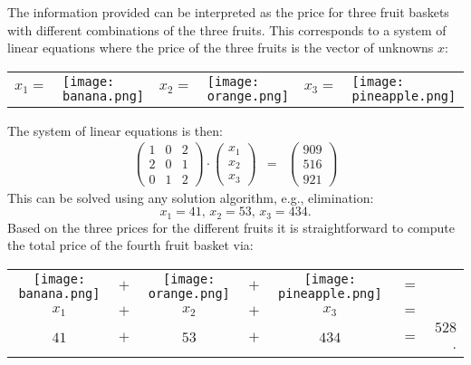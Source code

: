 \begin{solution}
The information provided can be interpreted as the price for three fruit baskets
with different combinations of the three fruits. This corresponds to a system of
linear equations where the price of the three fruits is the vector of unknowns $x$:
\begin{center}
\begin{tabular}{clclcl}
$x_1 =$ & \texttt{[image: banana.png]} & $x_2 =$ & \texttt{[image: orange.png]} & $x_3 =$ & \texttt{[image: pineapple.png]}
\end{tabular}
\end{center}
The system of linear equations is then:
\begin{eqnarray*}
\left( \begin{array}{rrr} 1 & 0 & 2 \\ 2 & 0 & 1 \\ 0 & 1 & 2 \end{array} \right) \cdot \left( \begin{array}{r} x_1 \\ x_2 \\ x_3 \end{array} \right) & = & \left( \begin{array}{r} 909 \\ 516 \\ 921 \end{array} \right)
\end{eqnarray*}
This can be solved using any solution algorithm, e.g., elimination:
$$
x_1 = 41, \, x_2 = 53, \, x_3 = 434.
$$
Based on the three prices for the different fruits it is straightforward to
compute the total price of the fourth fruit basket via:
\begin{center}
\begin{tabular}{ccccccr}
\texttt{[image: banana.png]} & $+$ & \texttt{[image: orange.png]} & $+$ & \texttt{[image: pineapple.png]} & $=$ & \\
$x_1$ & $+$ & $x_2$ & $+$ & $x_3$ & $=$ & \\
$41$ & $+$ & $53$ & $+$ & $434$ & $=$ & $528$.
\end{tabular}
\end{center}
\end{solution}



